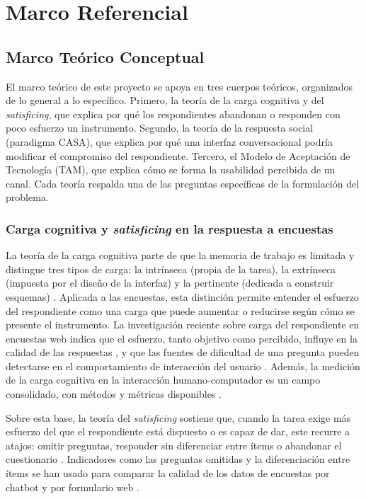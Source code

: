 \documentclass[12pt,letterpaper]{article}
\begin{document}
\section{Marco Referencial}

\subsection{Marco Teórico Conceptual}

El marco teórico de este proyecto se apoya en tres cuerpos teóricos, organizados de lo general a lo específico. Primero, la teoría de la carga cognitiva y del \textit{satisficing}, que explica por qué los respondientes abandonan o responden con poco esfuerzo un instrumento. Segundo, la teoría de la respuesta social (paradigma CASA), que explica por qué una interfaz conversacional podría modificar el compromiso del respondiente. Tercero, el Modelo de Aceptación de Tecnología (TAM), que explica cómo se forma la usabilidad percibida de un canal. Cada teoría respalda una de las preguntas específicas de la formulación del problema.

\subsubsection{Carga cognitiva y \textit{satisficing} en la respuesta a encuestas}

La teoría de la carga cognitiva parte de que la memoria de trabajo es limitada y distingue tres tipos de carga: la intrínseca (propia de la tarea), la extrínseca (impuesta por el diseño de la interfaz) y la pertinente (dedicada a construir esquemas) \cite{sweller1994}. Aplicada a las encuestas, esta distinción permite entender el esfuerzo del respondiente como una carga que puede aumentar o reducirse según cómo se presente el instrumento. La investigación reciente sobre carga del respondiente en encuestas web indica que el esfuerzo, tanto objetivo como percibido, influye en la calidad de las respuestas \cite{kunz2025}, y que las fuentes de dificultad de una pregunta pueden detectarse en el comportamiento de interacción del usuario \cite{leipold2025}. Además, la medición de la carga cognitiva en la interacción humano-computador es un campo consolidado, con métodos y métricas disponibles \cite{kosch2023}.

Sobre esta base, la teoría del \textit{satisficing} sostiene que, cuando la tarea exige más esfuerzo del que el respondiente está dispuesto o es capaz de dar, este recurre a atajos: omitir preguntas, responder sin diferenciar entre ítems o abandonar el cuestionario \cite{krosnick1991}. Indicadores como las preguntas omitidas y la diferenciación entre ítems se han usado para comparar la calidad de los datos de encuestas por chatbot y por formulario web \cite{beam2023}.
\end{document}
